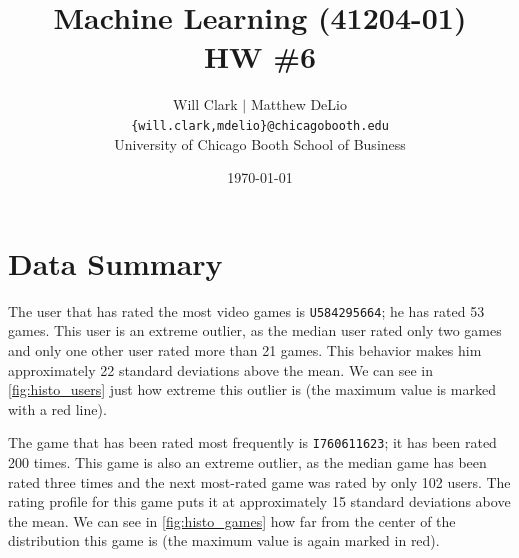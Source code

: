 



\title{Machine Learning (41204-01)\\HW \#6}
\author{Will Clark $\vert$ Matthew DeLio \\
\texttt{\{will.clark,mdelio\}@chicagobooth.edu} \\
University of Chicago Booth School of Business}
\date{\today}
\maketitle

\section{Data Summary}

The user that has rated the most video games is \texttt{U584295664}; he has rated 53 games. This user is an extreme outlier, as the median user rated only two games and only one other user rated more than 21 games. This behavior makes him approximately 22 standard deviations above the mean. We can see in \cref{fig:histo_users} just how extreme this outlier is (the maximum value is marked with a red line).

The game that has been rated most frequently is \texttt{I760611623}; it has been rated 200 times. This game is also an extreme outlier, as the median game has been rated three times and the next most-rated game was rated by only 102 users. The rating profile for this game puts it at approximately 15 standard deviations above the mean. We can see in \cref{fig:histo_games} how far from the center of the distribution this game is (the maximum value is again marked in red).


